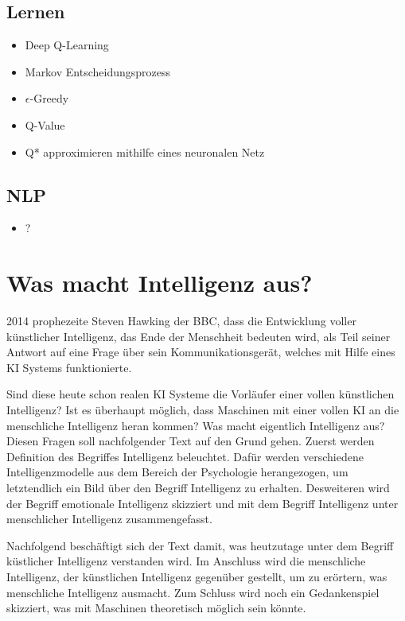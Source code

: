 \documentclass[a4paper, 11pt]{scrartcl}
\begin{document}
\subsection{Lernen}
\begin{itemize}
  \item Deep Q-Learning
  \item Markov Entscheidungsprozess
  \item $\epsilon$-Greedy
  \item Q-Value
  \item Q* approximieren mithilfe eines neuronalen Netz
\end{itemize}

\subsection{NLP}
\begin{itemize}
  \item ?
\end{itemize}

\newpage

\section{Was macht Intelligenz aus?}

2014 prophezeite Steven Hawking der BBC, dass die Entwicklung voller künstlicher Intelligenz,
das Ende der Menschheit bedeuten wird, als Teil seiner Antwort auf eine Frage über sein Kommunikationsgerät, welches
mit Hilfe eines KI Systems funktionierte.

Sind diese heute schon realen KI Systeme die Vorläufer einer vollen künstlichen Intelligenz? Ist es überhaupt möglich,
dass Maschinen mit einer vollen KI an die menschliche Intelligenz heran kommen? Was macht eigentlich Intelligenz aus?
Diesen Fragen soll nachfolgender Text auf den Grund gehen.
Zuerst werden Definition des Begriffes Intelligenz beleuchtet. Dafür werden verschiedene Intelligenzmodelle aus dem
Bereich der Psychologie herangezogen, um letztendlich ein Bild über den Begriff Intelligenz zu erhalten.
Desweiteren wird der Begriff emotionale Intelligenz skizziert und mit dem Begriff Intelligenz unter menschlicher
Intelligenz zusammengefasst.

Nachfolgend beschäftigt sich der Text damit, was heutzutage unter dem Begriff küstlicher Intelligenz verstanden wird.
Im Anschluss wird die menschliche Intelligenz, der künstlichen Intelligenz gegenüber gestellt, um zu erörtern, was
menschliche Intelligenz ausmacht. Zum Schluss wird noch ein Gedankenspiel skizziert, was mit Maschinen theoretisch
möglich sein könnte.
\end{document}
